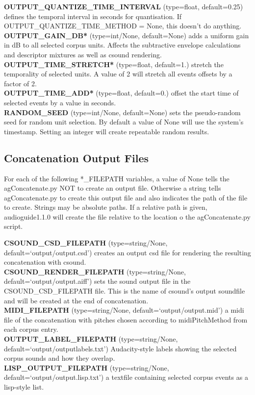 \documentclass{article}
\newcommand{\optEntry}[4]{\textbf{#1} (type={\color{red}#2}, default={\color{ForestGreen}#3}) #4\hspace{0.5em}\\}
\newcommand{\ag}{audioguide1.1.0\xspace}
\begin{document}
\begin{spacing}{1.2}
\optEntry{OUTPUT\_QUANTIZE\_TIME\_INTERVAL}{float}{0.25}{defines the temporal interval in seconds for quantisation.  If OUTPUT\_QUANTIZE\_TIME\_METHOD = None, this doesn't do anything.}

\optEntry{OUTPUT\_GAIN\_DB*}{int/None}{None}{adds a uniform gain in dB to all selected corpus units.  Affects the subtractive envelope calculations and descriptor mixtures as well as csound rendering.}

\optEntry{OUTPUT\_TIME\_STRETCH*}{float}{1.}{stretch the temporality of selected units.  A value of 2 will stretch all events offsets by a factor of 2.}

\optEntry{OUTPUT\_TIME\_ADD*}{float}{0.}{offset the start time of selected events by a value in seconds.}

\optEntry{RANDOM\_SEED}{int/None}{None}{sets the pseudo-random seed for random unit selection.  By default a value of None will use the system's timestamp.  Setting an integer will create repeatable random results.}


\subsection{Concatenation Output Files}\label{outputfiles}
For each of the following *\_FILEPATH variables, a value of None tells the agConcatenate.py NOT to create an output file.  Otherwise a string tells agConcatenate.py to create this output file and also indicates the path of the file to create.  Strings may be absolute paths.  If a relative path is given, \ag will create the file relative to the location o the agConcatenate.py script.

\optEntry{CSOUND\_CSD\_FILEPATH}{string/None}{`output/output.csd'}{creates an output csd file for rendering the resulting concatenation with csound.}

\optEntry{CSOUND\_RENDER\_FILEPATH}{string/None}{`output/output.aiff'}{sets the sound output file in the CSOUND\_CSD\_FILEPATH file.  This is the name of csound's output soundfile and will be created at the end of concatenation.}

\optEntry{MIDI\_FILEPATH}{string/None}{`output/output.mid'}{a midi file of the concatenation with pitches chosen according to midiPitchMethod from each corpus entry.}

\optEntry{OUTPUT\_LABEL\_FILEPATH}{string/None}{`output/outputlabels.txt'}{Audacity-style labels showing the selected corpus sounds and how they overlap.}

\optEntry{LISP\_OUTPUT\_FILEPATH}{string/None}{`output/output.lisp.txt'}{a textfile containing selected corpus events as a lisp-style list.}


\end{spacing}
\end{document}
